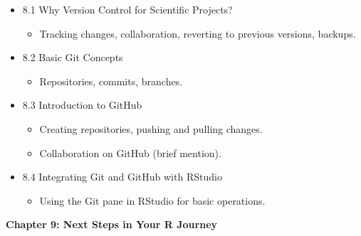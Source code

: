 \documentclass[
  letterpaper,
  DIV=11,
  numbers=noendperiod]{scrreprt}
\providecommand{\tightlist}{%
  \setlength{\itemsep}{0pt}\setlength{\parskip}{0pt}}\usepackage{longtable,booktabs,array}
\begin{document}
\begin{itemize}
\tightlist
\item
  8.1 Why Version Control for Scientific Projects?

  \begin{itemize}
  \tightlist
  \item
    Tracking changes, collaboration, reverting to previous versions,
    backups.
  \end{itemize}
\item
  8.2 Basic Git Concepts

  \begin{itemize}
  \tightlist
  \item
    Repositories, commits, branches.
  \end{itemize}
\item
  8.3 Introduction to GitHub

  \begin{itemize}
  \tightlist
  \item
    Creating repositories, pushing and pulling changes.
  \item
    Collaboration on GitHub (brief mention).
  \end{itemize}
\item
  8.4 Integrating Git and GitHub with RStudio

  \begin{itemize}
  \tightlist
  \item
    Using the Git pane in RStudio for basic operations.
  \end{itemize}
\end{itemize}

\textbf{Chapter 9: Next Steps in Your R Journey}
\end{document}
